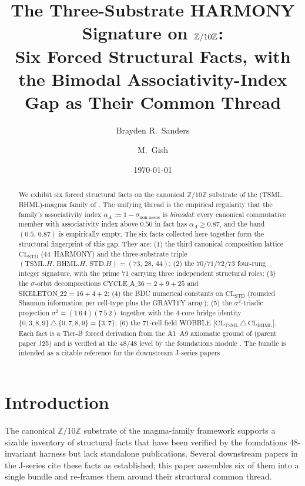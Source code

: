 \documentclass[11pt,reqno]{amsart}
\title[Three-Substrate HARMONY Signature on $\Z/10\Z$]
{The Three-Substrate HARMONY Signature on $\Z/10\Z$:\\
Six Forced Structural Facts, with the Bimodal Associativity-Index
Gap as Their Common Thread}
\author{Brayden R.\ Sanders}
\author{M.\ Gish}
\date{\today}
\theoremstyle{plain}
\theoremstyle{definition}
\theoremstyle{remark}
\newcommand{\Z}{\mathbb{Z}}
\newcommand{\TSML}{\mathrm{TSML}}
\newcommand{\BHML}{\mathrm{BHML}}
\newcommand{\STD}{\mathrm{STD}}
\begin{document}
\begin{abstract}
We exhibit six forced structural facts on the canonical $\Z/10\Z$
substrate of the (TSML, BHML)-magma family of \cite{SandersForcing}.
The unifying thread is the empirical regularity that the family's
associativity index $\alpha_A := 1-\sigma_{\mathrm{non\text{-}assoc}}$ is
\emph{bimodal}: every canonical commutative member with associativity
index above $0.50$ in fact has $\alpha_A \ge 0.87$, and the band
$(0.5,\,0.87)$ is empirically empty. The six facts collected here
together form the structural fingerprint of this gap. They are: (1)
the third canonical composition lattice $\mathrm{CL}_\STD$ (44~HARMONY)
and the three-substrate triple
$(\TSML.H,\,\BHML.H,\,\STD.H)=(73,\,28,\,44)$; (2) the
$70/71/72/73$ four-rung integer signature, with the prime $71$
carrying three independent structural roles; (3) the
$\sigma$-orbit decompositions $\mathrm{CYCLE\_A\_36}=2+9+25$ and
$\mathrm{SKELETON\_22}=16+4+2$; (4) the BDC numerical constants on
$\mathrm{CL}_\STD$ (rounded Shannon information per cell-type plus the
GRAVITY array); (5) the $\sigma^2$-triadic projection
$\sigma^2 = (1\,6\,4)(7\,5\,2)$ together with the $4$-core bridge
identity $\{0,3,8,9\}\,\triangle\,\{0,7,8,9\}=\{3,7\}$;
(6) the $71$-cell field WOBBLE $|\mathrm{CL}_\TSML\,\triangle\,\mathrm{CL}_\BHML|$.
Each fact is a Tier-B forced derivation from the A1--A9 axiomatic
ground of \cite{SandersForcing} (parent paper J25) and is verified at
the $48/48$ level by the foundations module
\cite{FoundationsModule}. The bundle is intended as a citable
reference for the downstream J-series papers
\cite{SandersGishFourCore,SandersGishSO8,SandersGishSO10}.
\end{abstract}

\maketitle

\tableofcontents

\section{Introduction}\label{sec:intro}

The canonical $\Z/10\Z$ substrate of the magma-family framework
\cite{SandersForcing} supports a sizable inventory of structural facts
that have been verified by the foundations 48-invariant harness
\cite{FoundationsModule} but lack standalone publications. Several
downstream papers in the J-series cite these facts as established;
this paper assembles six of them into a single bundle and re-frames
them around their structural common thread.
\end{document}
